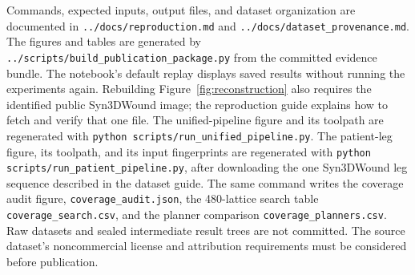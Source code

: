 \documentclass[conference]{IEEEtran}
\begin{document}
Commands, expected inputs, output files, and dataset organization are
documented in \texttt{../docs/reproduction.md} and
\texttt{../docs/dataset\_provenance.md}. The figures and tables are generated
by \texttt{../scripts/build\_publication\_package.py} from the committed
evidence bundle. The notebook's default replay displays saved results
without running the experiments again. Rebuilding Figure~\ref{fig:reconstruction}
also requires the identified public Syn3DWound image; the reproduction guide
explains how to fetch and verify that one file. The unified-pipeline figure
and its toolpath are regenerated with
\texttt{python scripts/run\_unified\_pipeline.py}. The patient-leg figure,
its toolpath, and its input fingerprints are regenerated with
\texttt{python scripts/run\_patient\_pipeline.py}, after downloading the one
Syn3DWound leg sequence described in the dataset guide. The same command
writes the coverage audit figure, \texttt{coverage\_audit.json}, the
480-lattice search table \texttt{coverage\_search.csv}, and the planner
comparison \texttt{coverage\_planners.csv}. Raw datasets and sealed
intermediate result trees are not committed. The source dataset's
noncommercial license and attribution requirements must be considered
before publication.
\end{document}
